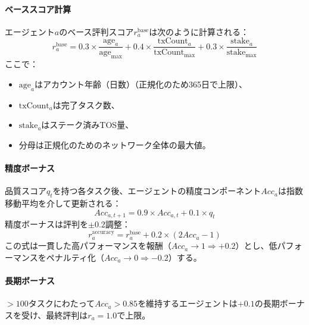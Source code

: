 \documentclass[11pt]{article}
\begin{document}
\paragraph{ベーススコア計算} エージェント$a$のベース評判スコア$r_a^{\text{base}}$は次のように計算される：
\begin{equation}
r_a^{\text{base}} = 0.3 \times \frac{\text{age}_a}{\text{age}_{\max}} + 0.4 \times \frac{\text{txCount}_a}{\text{txCount}_{\max}} + 0.3 \times \frac{\text{stake}_a}{\text{stake}_{\max}}
\end{equation}
ここで：
\begin{itemize}[noitemsep]
  \item $\text{age}_a$はアカウント年齢（日数）（正規化のため365日で上限）、
  \item $\text{txCount}_a$は完了タスク数、
  \item $\text{stake}_a$はステーク済みTOS量、
  \item 分母は正規化のためのネットワーク全体の最大値。
\end{itemize}

\paragraph{精度ボーナス} 品質スコア$q_t$を持つ各タスク後、エージェントの精度コンポーネント$Acc_a$は指数移動平均を介して更新される：
\begin{equation}
Acc_{a,t+1} = 0.9 \times Acc_{a,t} + 0.1 \times q_t
\end{equation}
精度ボーナスは評判を$\pm 0.2$調整：
\begin{equation}
r_a^{\text{accuracy}} = r_a^{\text{base}} + 0.2 \times (2 Acc_a - 1)
\end{equation}
この式は一貫した高パフォーマンスを報酬（$Acc_a \to 1 \Rightarrow +0.2$）とし、低パフォーマンスをペナルティ化（$Acc_a \to 0 \Rightarrow -0.2$）する。

\paragraph{長期ボーナス} $>100$タスクにわたって$Acc_a > 0.85$を維持するエージェントは$+0.1$の長期ボーナスを受け、最終評判は$r_a = 1.0$で上限。
\end{document}
